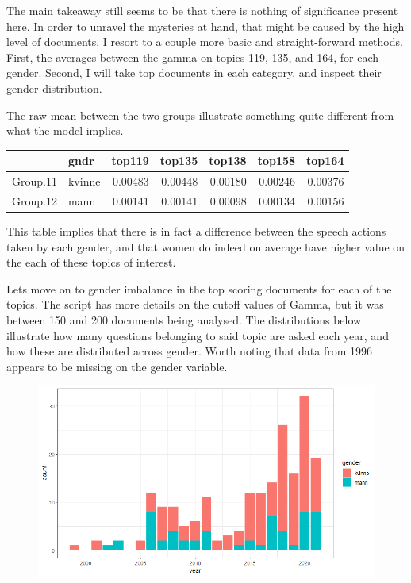 \documentclass[12pt]{article}
\begin{document}
	The main takeaway still seems to be that there is nothing of significance present here. In order to unravel the mysteries at hand, that might be caused by the high level of documents, I resort to a couple more basic and straight-forward methods. First, the averages between the gamma on topics 119, 135, and 164, for each gender. Second, I will take top documents in each category, and inspect their gender distribution. 
	
	The raw mean between the two groups illustrate something quite different from what the model implies. 
	\begin{table}[ht]
		\centering
		\begin{tabular}{rlrrrrr}
			\hline
			& gndr & top119 & top135 & top138 & top158 & top164 \\ 
			\hline
			Group.11 & kvinne & 0.00483 & 0.00448 & 0.00180 & 0.00246 & 0.00376 \\ 
			Group.12 & mann & 0.00141 & 0.00141 & 0.00098 & 0.00134 & 0.00156 \\ 
			\hline
		\end{tabular}
	\end{table}

	This table implies that there is in fact a difference between the speech actions taken by each gender, and that women do indeed on average have higher value on the each of these topics of interest. 
	
	Lets move on to gender imbalance in the top scoring documents for each of the topics. The script has more details on the cutoff values of Gamma, but it was between 150 and 200 documents being analysed. The distributions below illustrate how many questions belonging to said topic are asked each year, and how these are distributed across gender. Worth noting that data from 1996 appears to be missing on the gender variable. 
	
	\begin{figure}[h]
		\centering
		\includegraphics[scale=0.80]{Img/119dist.png}
	\end{figure}
	
\end{document}
